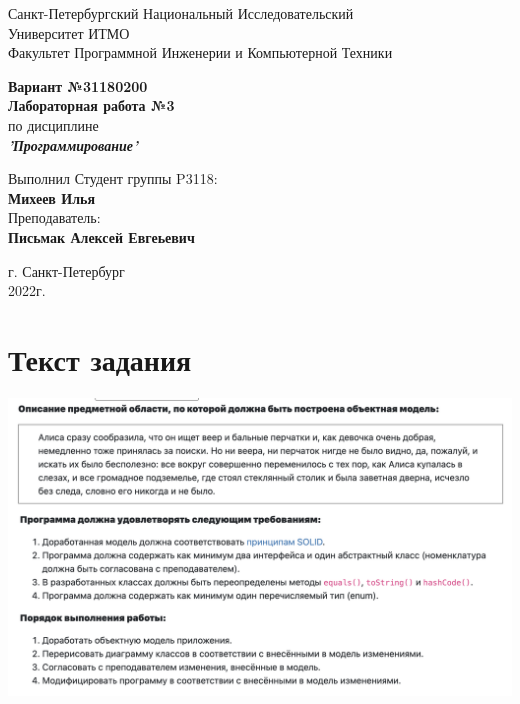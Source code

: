 \documentclass[12pt,onecolumn]{article}
\begin{document}
\begin{center}
    Санкт-Петербургский Национальный Исследовательский\\ 
    Университет ИТМО\\
    Факультет Программной Инженерии и Компьютерной Техники\\
\end{center}
\vspace{1cm}


\begin{center}
    \large \textbf{Вариант №31180200}\\
    \textbf{Лабораторная работа №3}\\
    по дисциплине\\
    \textbf{\textit{'Программирование'}}
\end{center}

\vspace{3cm}
\begin{flushright}
  Выполнил Студент  группы P3118: \\
  \textbf{Михеев Илья}\\
  Преподаватель: \\
  \textbf{Письмак Алексей Евгеьевич}\\
\end{flushright}

\vspace{14cm}
\begin{center}
    г. Санкт-Петербург\\
    2022г.
\end{center}

\newpage

\tableofcontents

\vspace{1cm}

\section{Текст задания}
\includegraphics[width=\columnwidth]{imgs/lab3_task.png}
\end{document}
